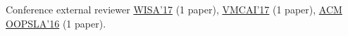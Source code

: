 

\begin{cvskills}

  \cvskill
    {Conference external reviewer} %
    {\href{http://www.wisa.or.kr/}{WISA'17} (1 paper), \href{http://conf.researchr.org/home/VMCAI-2017}{VMCAI'17} (1 paper), \href{http://2016.splashcon.org/track/splash-2016-oopsla}{ACM OOPSLA'16} (1 paper).} %



\end{cvskills}





